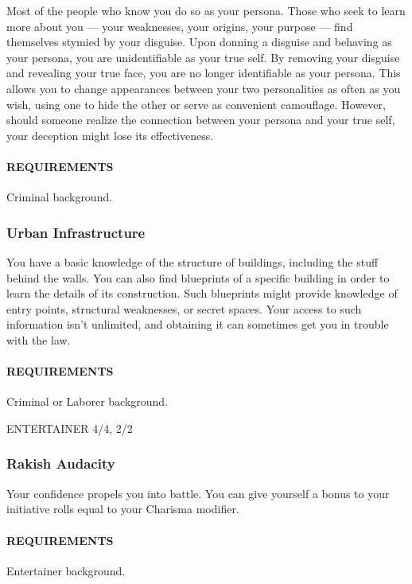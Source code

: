         Most of the people who know you do so as your persona.
        Those who seek to learn more about you --- your weaknesses, your origins, your purpose --- find themselves stymied by your disguise.
        Upon donning a disguise and behaving as your persona, you are unidentifiable as your true self.
        By removing your disguise and revealing your true face, you are no longer identifiable as your persona.
        This allows you to change appearances between your two personalities as often as you wish, using one to hide the other or serve as convenient camouflage.
        However, should someone realize the connection between your persona and your true self, your deception might lose its effectiveness.
        \paragraph{REQUIREMENTS} Criminal background.

    \subsubsection{Urban Infrastructure} \label{feat::urbaninfrastructure}
        You have a basic knowledge of the structure of buildings, including the stuff behind the walls.
        You can also find blueprints of a specific building in order to learn the details of its construction.
        Such blueprints might provide knowledge of entry points, structural weaknesses, or secret spaces.
        Your access to such information isn't unlimited, and obtaining it can sometimes get you in trouble with the law.
        \paragraph{REQUIREMENTS} Criminal or Laborer background.

ENTERTAINER 4/4, 2/2
    \subsubsection{Rakish Audacity} \label{feat::rakishaudacity}
        Your confidence propels you into battle.
        You can give yourself a bonus to your initiative rolls equal to your Charisma modifier.
        \paragraph{REQUIREMENTS} Entertainer background.

